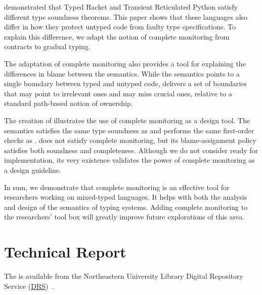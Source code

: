  demonstrated that Typed Racket and Transient
Reticulated Python satisfy different type soundness theorems. This paper
shows that these languages also differ in how they protect
untyped code from faulty type specifications. To explain this difference,
we adapt the notion of complete monitoring from contracts to gradual
typing.

The adaptation of complete monitoring also provides a tool for explaining
the differences in blame between the semantics. While the \Nname{} semantics
points to a single boundary between typed and untyped code, \Tname{} delivers a
set of boundaries that may point to irrelevant ones and may miss crucial ones,
relative to a standard path-based notion of ownership.

The creation of \Aname{} illustrates the use of complete monitoring as
a design tool. The \Aname{} semantics satisfies the same type soundness
as \Nname{} and performs the same first-order checks
as \Tname{}. \Aname{} does not satisfy complete monitoring, but its
blame-assignment policy satisfies both soundness and completeness.
Although we do not consider \Aname{} ready for
implementation, its very existence validates the power of complete
monitoring as a design guideline.

In sum, we demonstrate that complete monitoring is an effective tool for
researchers working on mixed-typed languages. It helps with both the
analysis and design of the semantics of typing systems. Adding complete
monitoring to the researchers' tool box will greatly improve future
explorations of this area. 


\section*{Technical Report}

The \techreport{} is available from the Northeastern University Library Digital
Repository Service (\href{"http://hdl.handle.net/2047/D20202641"}{DRS})~\cite{gfd-tr-2019}.
